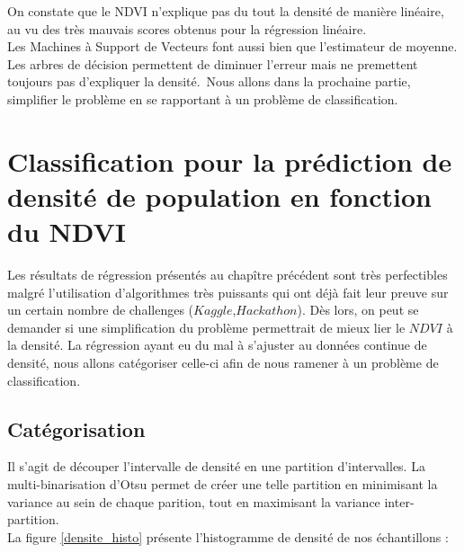 \documentclass{book}
\begin{document}
On constate que le NDVI n'explique pas du tout la densité de manière linéaire, au vu des très mauvais scores obtenus pour la régression linéaire.\\
Les Machines à Support de Vecteurs font aussi bien que l'estimateur de moyenne.\\
Les arbres de décision permettent de diminuer l'erreur mais ne premettent toujours pas d'expliquer la densité.\
Nous allons dans la prochaine partie, simplifier le problème en se rapportant à un problème de classification.\\

\chapter{Classification pour la prédiction de densité de population en fonction du NDVI}

Les résultats de régression présentés au chapître précédent sont très perfectibles malgré l'utilisation d'algorithmes très puissants qui ont déjà fait leur
preuve sur un certain nombre de challenges ($Kaggle$,$Hackathon$). Dès lors, on peut se demander si une simplification du problème permettrait de mieux lier
le $NDVI$ à la densité. La régression ayant eu du mal à s'ajuster au données continue de densité, nous allons catégoriser celle-ci afin de nous ramener à un
problème de classification.

\section{Catégorisation}
Il s'agit de découper l'intervalle de densité en une partition d'intervalles. La multi-binarisation d'Otsu permet de créer une telle partition en
minimisant la variance au sein de chaque parition, tout en maximisant la variance inter-partition.\\
La figure \ref{densite_histo} présente l'histogramme de densité de nos échantillons :
\end{document}

